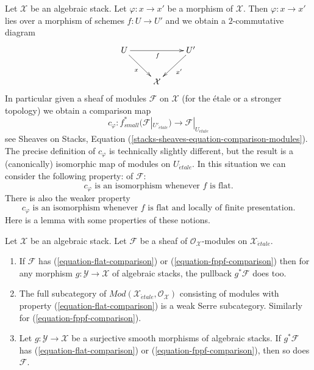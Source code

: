 \noindent
Let $\mathcal{X}$ be an algebraic stack. Let $\varphi : x \to x'$ be
a morphism of $\mathcal{X}$. Then $\varphi : x \to x'$ lies over a
morphism of schemes $f : U \to U'$ and we obtain a $2$-commutative diagram
$$
\xymatrix{
U \ar[rd]_x \ar[rr]_f & & U' \ar[ld]^{x'} \\
& \mathcal{X}
}
$$
In particular given a sheaf of modules $\mathcal{F}$ on $\mathcal{X}$
(for the \'etale or a stronger topology) we obtain a comparison map
\begin{equation}
\label{equation-comparison-modules}
c_\varphi :
f_{small}^*(\mathcal{F}|_{U'_{\acute{e}tale}})
\longrightarrow
\mathcal{F}|_{U_{\acute{e}tale}}
\end{equation}
see Sheaves on Stacks, Equation
(\ref{stacks-sheaves-equation-comparison-modules}).
The precise definition of
$c_\varphi$ is technically slightly different, but the result is a
(canonically) isomorphic map of modules on $U_{\acute{e}tale}$.
In this situation we can consider the following property:
of $\mathcal{F}$:
\begin{equation}
\label{equation-flat-comparison}
c_\varphi\text{ is an isomorphism whenever }f\text{ is flat.}
\end{equation}
There is also the weaker property
\begin{equation}
\label{equation-fppf-comparison}
c_\varphi\text{ is an isomorphism whenever }f
\text{ is flat and locally of finite presentation.}
\end{equation}
Here is a lemma with some properties of these notions.

\begin{lemma}
\label{lemma-check-flat-comparison-on-etale-covering}
Let $\mathcal{X}$ be an algebraic stack. Let $\mathcal{F}$
be a sheaf of $\mathcal{O}_\mathcal{X}$-modules on
$\mathcal{X}_{\acute{e}tale}$.
\begin{enumerate}
\item If $\mathcal{F}$ has (\ref{equation-flat-comparison}) or
(\ref{equation-fppf-comparison}) then for any morphism
$g : \mathcal{Y} \to \mathcal{X}$ of algebraic stacks, the
pullback $g^*\mathcal{F}$ does too.
\item The full subcategory of
$\textit{Mod}(\mathcal{X}_{\acute{e}tale}, \mathcal{O}_\mathcal{X})$
consisting of modules with property (\ref{equation-flat-comparison})
is a weak Serre subcategory. Similarly for (\ref{equation-fppf-comparison}).
\item  Let $g : \mathcal{Y} \to \mathcal{X}$ be a surjective smooth
morphisms of algebraic stacks. If $g^*\mathcal{F}$
has (\ref{equation-flat-comparison}) or (\ref{equation-fppf-comparison}),
then so does $\mathcal{F}$.
\end{enumerate}
\end{lemma}

